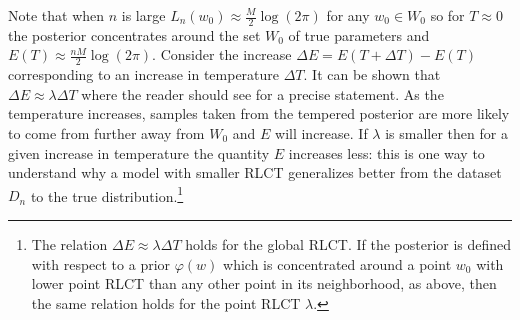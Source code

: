 \documentclass{article} %
\begin{document}
Note that when $n$ is large $L_n(w_0) \approx \frac{M}{2} \log(2\pi)$ for any $w_0 \in W_0$ so for $T \approx 0$ the posterior concentrates around the set $W_0$ of true parameters and $E(T) \approx \frac{nM}{2} \log(2\pi)$. Consider the increase $\Delta E = E(T + \Delta T) - E(T)$ corresponding to an increase in temperature $\Delta T$. It can be shown that 
$
\Delta E \approx \lambda \Delta T
$
where the reader should see \citep[Corollary 3]{watanabe_widely_2013} for a precise statement. As the temperature increases, samples taken from the tempered posterior are more likely to come from further away from $W_0$ and $E$ will increase. If $\lambda$ is smaller then for a given increase in temperature the quantity $E$ increases less: this is one way to understand why a model with smaller RLCT generalizes better from the dataset $D_n$ to the true distribution.\footnote{The relation $\Delta E \approx \lambda \Delta T$ holds for the global RLCT. If the posterior is defined with respect to a prior $\varphi(w)$ which is concentrated around a point $w_0$ with lower point RLCT than any other point in its neighborhood, as above, then the same relation holds for the point RLCT $\lambda$.}




\end{document}
